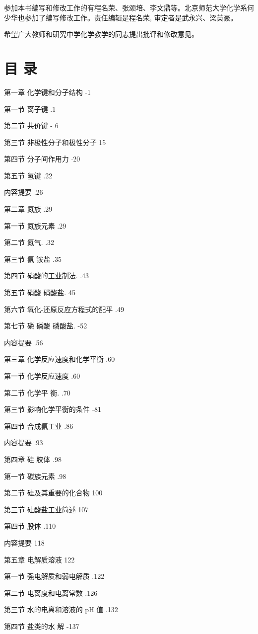 \documentclass[10pt]{article}
\begin{document}
参加本书编写和修改工作的有程名荣、张颂培、李文鼎等。北京师范大学化学系何少华也参加了编写修改工作。责任编辑是程名荣, 审定者是武永兴、梁英豪。

希望广大教师和研究中学化学教学的同志提出批评和修改意见。

\section*{目 录}

第一章 化学键和分子结构 -1

第一节 离子键 .1

第二节 共价键 - 6

第三节 非极性分子和极性分子 15

第四节 分子间作用力 \(\cdot {20}\)

第五节 氢键 .22

内容提要 .26

第二章 氮族 .29

第一节 氮族元素 .29

第二节 氮气. .32

第三节 氨 铵盐 .35

第四节 硝酸的工业制法. .43

第五节 硝酸 硝酸盐. 45

第六节 氧化-还原反应方程式的配平 .49

第七节 磷 磷酸 磷酸盐. -52

内容提要 .56

第三章 化学反应速度和化学平衡 .60

第一节 化学反应速度 .60

第二节 化学平 衡. .70

第三节 影响化学平衡的条件 -81

第四节 合成氨工业 .86

内容提要 .93

第四章 硅 胶体 .98

第一节 碳族元素 .98

第二节 硅及其重要的化合物 100

第三节 硅酸盐工业简述 107

第四节 股体 .110

内容提要 118

第五章 电解质溶液 122

第一节 强电解质和弱电解质 .122

第二节 电离度和电离常数 .126

第三节 水的电离和溶液的 \(\mathrm{{pH}}\) 值 .132

第四节 盐类的水 解 -137
\end{document}
